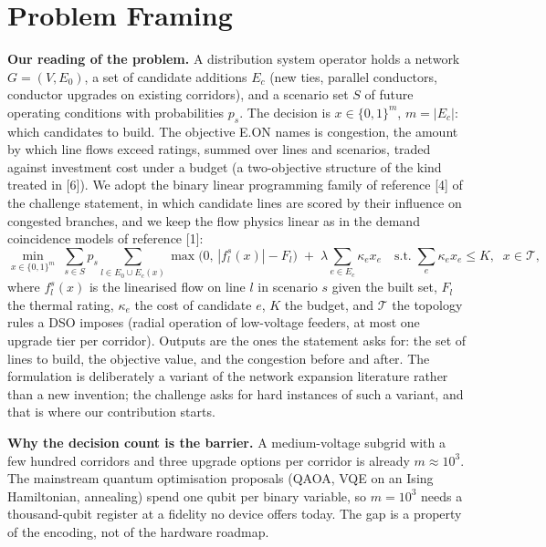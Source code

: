 \documentclass[10pt,a4paper]{article}
\begin{document}
\section{Problem Framing}

\textbf{Our reading of the problem.} A distribution system operator holds a
network $G=(V,E_0)$, a set of candidate additions $E_c$ (new ties, parallel
conductors, conductor upgrades on existing corridors), and a scenario set
$S$ of future operating conditions with probabilities $p_s$. The decision is
$x\in\{0,1\}^{m}$, $m=|E_c|$: which candidates to build. The objective E.ON
names is congestion, the amount by which line flows exceed ratings, summed
over lines and scenarios, traded against investment cost under a budget (a
two-objective structure of the kind treated in [6]). We
adopt the binary linear programming family of reference [4] of the challenge
statement, in which candidate lines are scored by their influence on
congested branches, and we keep the flow physics linear as in the demand
coincidence models of reference [1]:
\begin{equation}
\min_{x\in\{0,1\}^m}\;\sum_{s\in S}p_s\sum_{l\in E_0\cup E_c(x)}
\max\!\bigl(0,\,|f^{s}_{l}(x)|-F_l\bigr)\;+\;\lambda\sum_{e\in E_c}\kappa_e x_e
\quad\text{s.t.}\;\sum_{e}\kappa_e x_e\le K,\;\; x\in\mathcal{T},
\label{eq:problem}
\end{equation}
where $f^{s}_{l}(x)$ is the linearised flow on line $l$ in scenario $s$ given
the built set, $F_l$ the thermal rating, $\kappa_e$ the cost of candidate $e$,
$K$ the budget, and $\mathcal{T}$ the topology rules a DSO imposes (radial
operation of low-voltage feeders, at most one upgrade tier per corridor).
Outputs are the ones the statement asks for: the set of lines to build, the
objective value, and the congestion before and after. The formulation is
deliberately a variant of the network expansion literature rather than a new
invention; the challenge asks for hard instances of such a variant, and that is
where our contribution starts.

\textbf{Why the decision count is the barrier.} A medium-voltage subgrid with a
few hundred corridors and three upgrade options per corridor is already
$m\approx 10^3$. The mainstream quantum optimisation proposals (QAOA, VQE on an Ising
Hamiltonian, annealing) spend one qubit per binary variable, so
$m=10^3$ needs a thousand-qubit register at a fidelity no device offers today. The
gap is a property of the encoding, not of the hardware roadmap.
\end{document}
